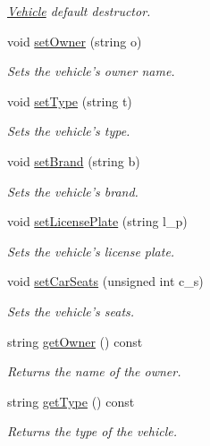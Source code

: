 \begin{DoxyCompactItemize}
\begin{DoxyCompactList}\small\item\em \hyperlink{class_vehicle}{Vehicle} default destructor. \end{DoxyCompactList}\item 
void \hyperlink{class_vehicle_ad39892e6ee302c039e06c3e629802d0f}{set\+Owner} (string o)
\begin{DoxyCompactList}\small\item\em Sets the vehicle's owner name. \end{DoxyCompactList}\item 
void \hyperlink{class_vehicle_a344f7cc363febf23d205877b544efef8}{set\+Type} (string t)
\begin{DoxyCompactList}\small\item\em Sets the vehicle's type. \end{DoxyCompactList}\item 
void \hyperlink{class_vehicle_af8466ac38dc2d48a1d65b8037b667d6b}{set\+Brand} (string b)
\begin{DoxyCompactList}\small\item\em Sets the vehicle's brand. \end{DoxyCompactList}\item 
void \hyperlink{class_vehicle_a048147fc584afa2bcb7abed044476a3c}{set\+License\+Plate} (string l\+\_\+p)
\begin{DoxyCompactList}\small\item\em Sets the vehicle's license plate. \end{DoxyCompactList}\item 
void \hyperlink{class_vehicle_ae5b5d36f539e0fad3d37466ffa2ec9dc}{set\+Car\+Seats} (unsigned int c\+\_\+s)
\begin{DoxyCompactList}\small\item\em Sets the vehicle's seats. \end{DoxyCompactList}\item 
string \hyperlink{class_vehicle_a02d081f322381db9695e30aa5bb4116b}{get\+Owner} () const 
\begin{DoxyCompactList}\small\item\em Returns the name of the owner. \end{DoxyCompactList}\item 
string \hyperlink{class_vehicle_ab3c3d57639bae4a51ea193582e26c5e7}{get\+Type} () const 
\begin{DoxyCompactList}\small\item\em Returns the type of the vehicle. \end{DoxyCompactList}\item 

\end{DoxyCompactItemize}

